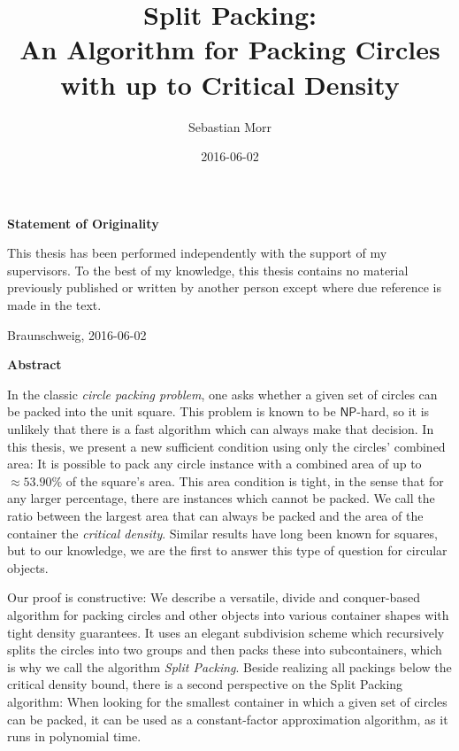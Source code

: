 \documentclass[a4paper,style=print,bibliography=totoc,nexus,lnum,extramargin]{tubsbook}
\title{Split Packing:\\ An Algorithm for Packing Circles with up to Critical Density}
\author{\sffamily\LARGE Sebastian Morr}
\date{\large 2016-06-02}
\begin{document}
\frontmatter

\maketitle
\cleardoublepage

\thispagestyle{plain}
\vspace*{7cm}
\centerline{\bfseries Statement of Originality}
\vspace*{1em}
\noindent
This thesis has been performed independently with the support of my supervisors.
To the best of my knowledge, this thesis contains no material previously
published or written by another person except where due reference is made in the text.

\par
  \bigskip\noindent Braunschweig, 2016-06-02 \par
  \vspace*{10mm}
  \hfill\hrulefill
\cleardoublepage

\thispagestyle{plain}
\centerline{\bfseries Abstract}
\vspace*{1em}
\noindent

In the classic \emph{circle packing problem}, one asks whether a given set of circles can be packed into the unit square. This problem is known to be $\mathsf{NP}$-hard, so it is unlikely that there is a fast algorithm which can always make that decision.
In this thesis, we present a new sufficient condition using only the circles' combined area: It is possible to pack any circle instance with a combined area of up to $\approx \! 53.90\%$ of the square's area. This area condition is tight, in the sense that for any larger percentage, there are instances which cannot be packed. We call the ratio between the largest area that can always be packed and the area of the container the \emph{critical density}. Similar results have long been known for squares, but to our knowledge, we are the first to answer this type of question for circular objects.

Our proof is constructive: We describe a versatile, divide and conquer-based algorithm for packing circles and other objects into various container shapes with tight density guarantees. It uses an elegant subdivision scheme which recursively splits the circles into two groups and then packs these into subcontainers, which is why we call the algorithm \emph{Split Packing}.
Beside realizing all packings below the critical density bound, there is a second perspective on the Split Packing algorithm: When looking for the smallest container in which a given set of circles can be packed, it can be used as a constant-factor approximation algorithm, as it runs in polynomial time.
\end{document}
